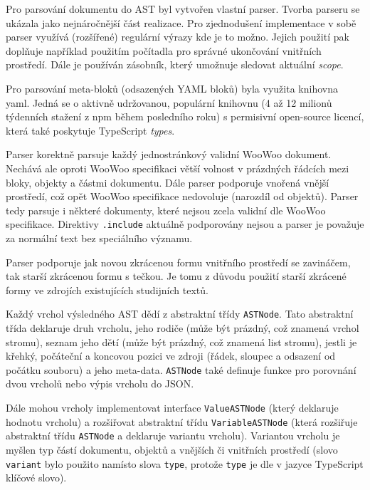 Pro parsování dokumentu do AST byl vytvořen vlastní parser. Tvorba parseru se ukázala jako nejnáročnější část realizace.
Pro zjednodušení implementace v sobě parser využívá (rozšířené) regulární výrazy kde je to možno. Jejich použití pak
doplňuje například použitím počítadla pro správné ukončování vnitřních prostředí. Dále je používán zásobník, který
umožnuje sledovat aktuální \textit{scope}.

\begin{sloppypar}
Pro parsování meta-bloků (odsazených YAML bloků) byla využita knihovna yaml. Jedná se o aktivně udržovanou, populární
knihovnu (4 až 12 milionů týdenních stažení z npm \cite{npm} během posledního roku) s permisivní open-source licencí,
která také poskytuje TypeScript \textit{types}.
\end{sloppypar}

Parser korektně parsuje každý jednostránkový validní WooWoo dokument. Nechává ale oproti WooWoo specifikaci větší
volnost v prázdných řádcích mezi bloky, objekty a částmi dokumentu. Dále parser podporuje vnořená vnější prostředí, což
opět WooWoo specifikace \cite{woowoo} nedovoluje (narozdíl od objektů). Parser tedy parsuje i některé dokumenty, které
nejsou zcela validní dle WooWoo specifikace. Direktivy \texttt{.include} aktuálně podporovány nejsou a parser
je považuje za normální text bez speciálního významu.

Parser podporuje jak novou zkrácenou formu vnitřního prostředí se zavináčem, tak starší zkrácenou formu s tečkou. Je
tomu z důvodu použití starší zkrácené formy ve zdrojích existujících studijních textů.

Každý vrchol výsledného AST dědí z abstraktní třídy \texttt{ASTNode}. Tato abstraktní třída deklaruje druh
vrcholu, jeho rodiče (může být prázdný, což znamená vrchol stromu), seznam jeho dětí (může být prázdný, což znamená list
stromu), jestli je křehký, počáteční a koncovou pozici ve zdroji (řádek, sloupec a odsazení od počátku souboru) a jeho
meta-data. \texttt{ASTNode} také definuje funkce pro porovnání dvou vrcholů nebo výpis vrcholu do JSON.

Dále mohou vrcholy implementovat interface \texttt{ValueASTNode} (který deklaruje hodnotu vrcholu) a
rozšiřovat abstraktní třídu \texttt{VariableASTNode} (která rozšiřuje abstraktní třídu \texttt
{ASTNode} a deklaruje variantu vrcholu). Variantou vrcholu je myšlen typ částí dokumentu, objektů a vnějších či
vnitřních prostředí (slovo \texttt{variant} bylo použito namísto slova \texttt{type}, protože
\texttt{type} je dle \cite{ts-docs} v jazyce TypeScript klíčové slovo).

